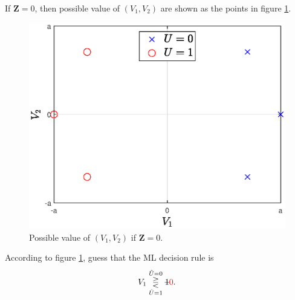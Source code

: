 \documentclass{assignment}
\begin{document}
\begin{sol}
    If $\bm{Z}=0$, then possible value of $(V_1,V_2)$ are shown as the points in figure \ref{P-2}.
    \begin{figure}[H]
        \centering
        \includegraphics[width=.4\columnwidth]{A-11-P-2.eps}
        \caption{Possible value of $(V_1,V_2)$ if $\bm{Z}=0$.}
        \label{P-2}
    \end{figure}

    According to figure \ref{P-2}, guess that the ML decision rule is
    \begin{align}
        V_1\overset{\hat{U}=0}{\underset{\hat{U}=1}{\gtreqless}}\text{\sout{$1$}}{\color{red}0}.
    \end{align}


\end{sol}
\end{document}

